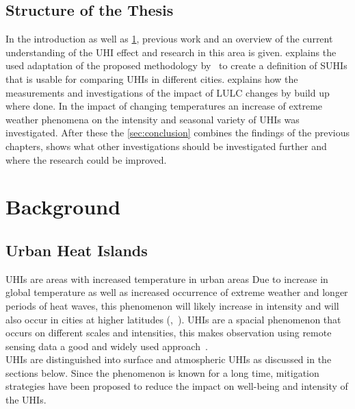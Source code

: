 \documentclass[12pt,a4paper, english,twoside]{article}
\begin{document}
  \subsection{Structure of the Thesis}\label{ssec:structure} 
    In the introduction as well as \cref{sec:background}, previous work and an overview of the current understanding of the \gls{UHI} effect and research in this area is given. 
     explains the used adaptation of the proposed methodology by~\cite{Sobrino2020} to create a definition of \glspl{SUHI} that is usable for comparing \glspl{UHI} in different cities.  
     explains how the measurements  and investigations of the impact of \gls{LULC} changes by build up where done.
    In  the impact of changing temperatures an increase of extreme weather phenomena on the intensity and seasonal variety of \glspl{UHI} was investigated. 
    After these the \cref{sec:conclusion} combines the findings of the previous chapters, shows what other investigations should be investigated further and where the research could be improved. 
%
\newpage
\section{Background}\label{sec:background}
  \subsection{Urban Heat Islands}
    \glspl{UHI} are areas with increased temperature in urban areas
    Due to increase in global temperature as well as increased occurrence of extreme weather and longer periods of heat waves, this phenomenon will likely increase in intensity and will also occur in cities at higher latitudes (\cite{Sachindra2016},~\cite[p.~904]{Wilby2008}).
    \glspl{UHI} are a spacial phenomenon that occurs on different scales and intensities, this makes observation using remote sensing data a good and widely used approach~\autocite{Weng2003}.\\
    \glspl{UHI} are distinguished into surface and atmospheric \glspl{UHI} as discussed in the sections below. 
    Since the phenomenon is known for a long time, mitigation strategies have been proposed to reduce the impact on well-being and intensity of the \glspl{UHI}.
%
\end{document}
